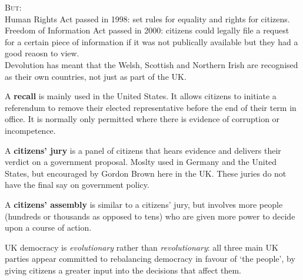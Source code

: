 \documentclass[12pt]{article}
\begin{document}
	\textsc{But}:\\
	Human Rights Act passed in 1998: set rules for equality and rights for citizens.\\
	Freedom of Information Act passed in 2000: citizens could legally file a request for a certain piece of information if it was not publically available but they had a good reaosn to view.\\
	Devolution has meant that the Welsh, Scottish and Northern Irish are recognised as their own countries, not just as part of the UK.
	
	A \textbf{recall} is mainly used in the United States.  It allows citizens to initiate a referendum to remove their elected representative before the end of their term in office.  It is normally only permitted where there is evidence of corruption or incompetence.
	
	A \textbf{citizens' jury} is a panel of citizens that hears evidence and delivers their verdict on a government proposal.  Moslty used in Germany and the United States, but encouraged by Gordon Brown here in the UK.  These juries do not have the final say on government policy.
	
	A \textbf{citizens' assembly} is similar to a citizens' jury, but involves more people (hundreds or thousands as opposed to tens) who are given more power to decide upon a course of action.
	
	UK democracy is \textsl{evolutionary} rather than \textsl{revolutionary}: all three main UK parties appear committed to rebalancing democracy in favour of `the people', by giving citizens a greater input into the decisions that affect them.
	
\end{document}
